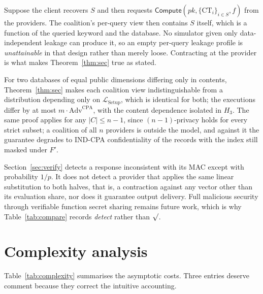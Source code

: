 \documentclass[a4paper,fleqn]{cas-dc}
\providecommand{\checkmark}{\ensuremath{\surd}}
\newcommand{\Leak}{\mathcal{L}}
\newcommand{\Compute}{\mathsf{Compute}}
\begin{document}
\begin{remark}
\label{rem:v1}
Suppose the client recovers $S$ and then requests
$\Compute(pk,\{\text{CT}_i\}_{i\in S},f)$ from the providers. The coalition's
per-query view then contains $S$ itself, which is a function of the queried
keyword and the database. No simulator given only data-independent leakage can
produce it, so an empty per-query leakage profile is \emph{unattainable} in
that design rather than merely loose. Contracting at the provider is what
makes Theorem~\ref{thm:sec} true as stated.
\end{remark}

\begin{remark}
For two databases of equal public dimensions differing only in contents,
Theorem~\ref{thm:sec} makes each coalition view indistinguishable from a
distribution depending only on $\Leak_{\mathrm{Setup}}$, which is identical
for both; the executions differ by at most $m\cdot\mathrm{Adv}^{\mathrm{CPA}}$,
with the content dependence isolated in $H_3$. The same proof applies for any
$|C|\le n-1$, since $(n{-}1)$-privacy holds for every strict subset; a
coalition of all $n$ providers is outside the model, and against it the
guarantee degrades to IND-CPA confidentiality of the records with the index
still masked under $F'$.
\end{remark}

\begin{remark}
Section~\ref{sec:verify} detects a response inconsistent with its MAC except
with probability $1/p$. It does not detect a provider that applies the same
linear substitution to both halves, that is, a contraction against any vector
other than its evaluation share, nor does it guarantee output delivery. Full
malicious security through verifiable function secret sharing remains future
work, which is why Table~\ref{tab:compare} records \emph{detect} rather than
$\checkmark$.
\end{remark}

\section{Complexity analysis}
\label{sec:complexity}

Table~\ref{tab:complexity} summarises the asymptotic costs. Three entries
deserve comment because they correct the intuitive accounting.
\end{document}
